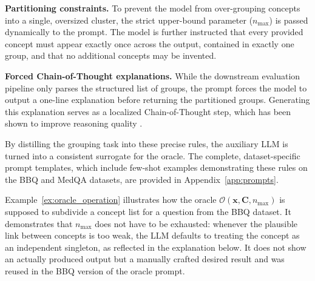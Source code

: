 \noindent\textbf{Partitioning constraints.} To prevent the model from over-grouping concepts into a single, oversized cluster, the strict upper-bound parameter ($n_{\max}$) is passed dynamically to the prompt. The model is further instructed that every provided concept must appear exactly once across the output, contained in exactly one group, and that no additional concepts may be invented.

\noindent\textbf{Forced Chain-of-Thought explanations.} While the downstream evaluation pipeline only parses the structured list of groups, the prompt forces the model to output a one-line explanation before returning the partitioned groups. Generating this explanation serves as a localized Chain-of-Thought step, which has been shown to improve reasoning quality \cite{weiChainofthoughtPromptingElicits2022}.

By distilling the grouping task into these precise rules, the auxiliary LLM is turned into a consistent surrogate for the oracle. The complete, dataset-specific prompt templates, which include few-shot examples demonstrating these rules on the BBQ and MedQA datasets, are provided in Appendix~\ref{app:prompts}.

Example~\ref{ex:oracle_operation} illustrates how the oracle $\mathcal{O}(\mathbf{x}, \mathbf{C}, n_{\max})$ is supposed to subdivide a concept list for a question from the BBQ dataset. It demonstrates that $n_{\max}$ does not have to be exhausted: whenever the plausible link between concepts is too weak, the LLM defaults to treating the concept as an independent singleton, as reflected in the explanation below. It does not show an actually produced output but a manually crafted desired result and was reused in the BBQ version of the oracle prompt.

